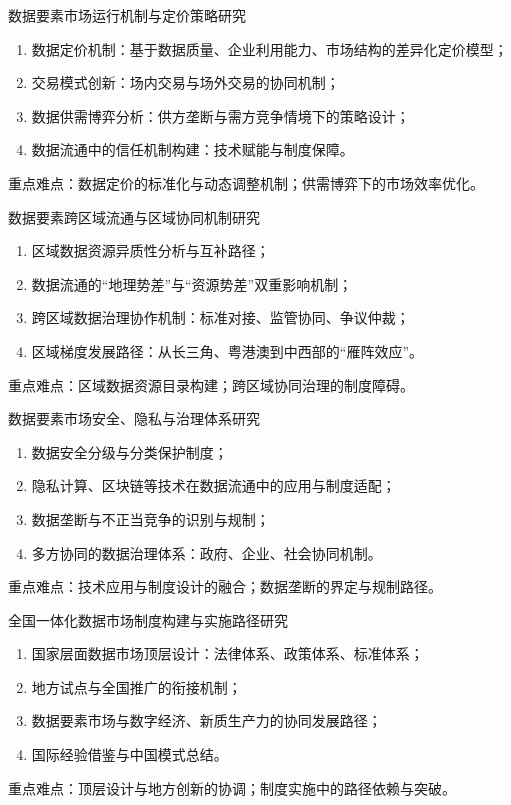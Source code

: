 \documentclass[10pt,aspectratio=169]{beamer}
\begin{document}
\begin{frame}{数据要素市场运行机制与定价策略研究}	
		\begin{enumerate}
		\item 数据定价机制：基于数据质量、企业利用能力、市场结构的差异化定价模型；
		\item 交易模式创新：场内交易与场外交易的协同机制；
		\item 数据供需博弈分析：供方垄断与需方竞争情境下的策略设计；
		\item 数据流通中的信任机制构建：技术赋能与制度保障。
	\end{enumerate}
重点难点：数据定价的标准化与动态调整机制；供需博弈下的市场效率优化。	
\end{frame}	

\begin{frame}{数据要素跨区域流通与区域协同机制研究}	
		\begin{enumerate}
		\item 区域数据资源异质性分析与互补路径；
		\item 数据流通的“地理势差”与“资源势差”双重影响机制；
		\item 跨区域数据治理协作机制：标准对接、监管协同、争议仲裁；
		\item 区域梯度发展路径：从长三角、粤港澳到中西部的“雁阵效应”。
	\end{enumerate}
重点难点：区域数据资源目录构建；跨区域协同治理的制度障碍。
\end{frame}	


\begin{frame}{数据要素市场安全、隐私与治理体系研究}	
		\begin{enumerate}
		\item 数据安全分级与分类保护制度；
		\item 隐私计算、区块链等技术在数据流通中的应用与制度适配；
		\item 数据垄断与不正当竞争的识别与规制；
		\item 多方协同的数据治理体系：政府、企业、社会协同机制。
	\end{enumerate}
重点难点：技术应用与制度设计的融合；数据垄断的界定与规制路径。
\end{frame}	

	

\begin{frame}{全国一体化数据市场制度构建与实施路径研究}	
	\begin{enumerate}
	\item	国家层面数据市场顶层设计：法律体系、政策体系、标准体系；
	\item 地方试点与全国推广的衔接机制；
	\item 数据要素市场与数字经济、新质生产力的协同发展路径；
	\item 国际经验借鉴与中国模式总结。
\end{enumerate}
重点难点：顶层设计与地方创新的协调；制度实施中的路径依赖与突破。
\end{frame}	
\end{document}
